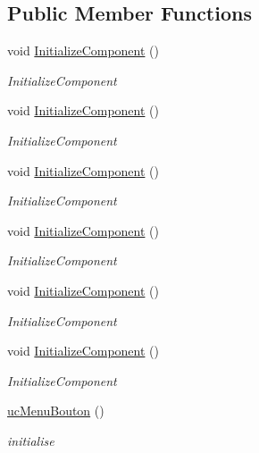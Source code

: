 \subsection*{Public Member Functions}
\begin{DoxyCompactItemize}
\item 
void \hyperlink{classnewPizza1_1_1ucMenuBouton_a080790946e454afc7d1441447a1e2313}{Initialize\+Component} ()
\begin{DoxyCompactList}\small\item\em Initialize\+Component \end{DoxyCompactList}\item 
void \hyperlink{classnewPizza1_1_1ucMenuBouton_a080790946e454afc7d1441447a1e2313}{Initialize\+Component} ()
\begin{DoxyCompactList}\small\item\em Initialize\+Component \end{DoxyCompactList}\item 
void \hyperlink{classnewPizza1_1_1ucMenuBouton_a080790946e454afc7d1441447a1e2313}{Initialize\+Component} ()
\begin{DoxyCompactList}\small\item\em Initialize\+Component \end{DoxyCompactList}\item 
void \hyperlink{classnewPizza1_1_1ucMenuBouton_a080790946e454afc7d1441447a1e2313}{Initialize\+Component} ()
\begin{DoxyCompactList}\small\item\em Initialize\+Component \end{DoxyCompactList}\item 
void \hyperlink{classnewPizza1_1_1ucMenuBouton_a080790946e454afc7d1441447a1e2313}{Initialize\+Component} ()
\begin{DoxyCompactList}\small\item\em Initialize\+Component \end{DoxyCompactList}\item 
void \hyperlink{classnewPizza1_1_1ucMenuBouton_a080790946e454afc7d1441447a1e2313}{Initialize\+Component} ()
\begin{DoxyCompactList}\small\item\em Initialize\+Component \end{DoxyCompactList}\item 
\hyperlink{classnewPizza1_1_1ucMenuBouton_a46685780f4b18a0406adfaa218a7351c}{uc\+Menu\+Bouton} ()
\begin{DoxyCompactList}\small\item\em initialise \end{DoxyCompactList}\end{DoxyCompactItemize}
